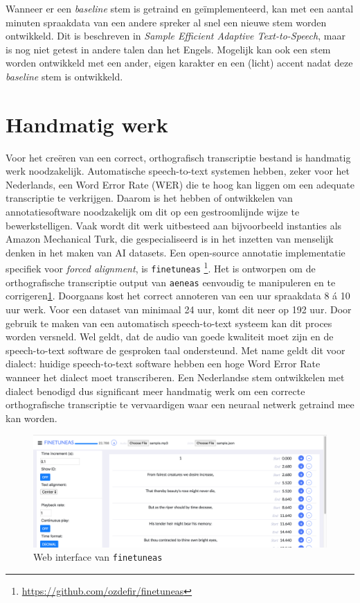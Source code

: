 Wanneer er een \textit{baseline} stem is getraind en geïmplementeerd, kan met een aantal minuten spraakdata van een andere spreker al snel een nieuwe stem worden ontwikkeld. Dit is beschreven in \textit{Sample Efficient Adaptive Text-to-Speech}, maar is nog niet getest in andere talen dan het Engels. Mogelijk kan ook een stem worden ontwikkeld met een ander, eigen karakter en een (licht) accent nadat deze \textit{baseline} stem is ontwikkeld.

\section{Handmatig werk}
Voor het creëren van een correct, orthografisch transcriptie bestand is handmatig werk noodzakelijk. Automatische speech-to-text systemen hebben, zeker voor het Nederlands, een Word Error Rate (WER) die te hoog kan liggen om een adequate transcriptie te verkrijgen. Daarom is het hebben of ontwikkelen van annotatiesoftware noodzakelijk om dit op een gestroomlijnde wijze te bewerkstelligen. Vaak wordt dit werk uitbesteed aan bijvoorbeeld instanties als Amazon Mechanical Turk, die gespecialiseerd is in het inzetten van menselijk denken in het maken van AI datasets. Een open-source annotatie implementatie specifiek voor \textit{forced alignment}, is \texttt{finetuneas} \footnote{\url{https://github.com/ozdefir/finetuneas}}. Het is ontworpen om de orthografische transcriptie output van \texttt{aeneas} eenvoudig te manipuleren en te corrigeren\ref{fig:finetuneas}. Doorgaans kost het correct annoteren van een uur spraakdata 8 á 10 uur werk\label{benodigd_werk}. Voor een dataset van minimaal 24 uur, komt dit neer op 192 uur. Door gebruik te maken van een automatisch speech-to-text systeem kan dit proces worden versneld. Wel geldt, dat de audio van goede kwaliteit moet zijn en de speech-to-text software de gesproken taal ondersteund. Met name geldt dit voor dialect: huidige speech-to-text software hebben een hoge Word Error Rate wanneer het dialect moet transcriberen. Een Nederlandse stem ontwikkelen met dialect benodigd dus significant meer handmatig werk om een correcte orthografische transcriptie te vervaardigen waar een neuraal netwerk getraind mee kan worden.

\begin{figure}[H]
    \centering
    \includegraphics[width=\textwidth]{figures/finetuneas.png}
    \caption{Web interface van \texttt{finetuneas}}
    \label{fig:finetuneas}
\end{figure}

